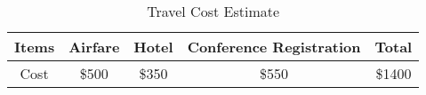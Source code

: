 \documentclass{res}
\begin{document}
\pagestyle{empty}


\begin{resume}

\begin{table}[!h]
\centering
\begin{tabular}{c||c|c|c||c}
\hline
Items & Airfare & Hotel & Conference Registration & Total \\
\hline
Cost & \$500 & \$350 & \$550 & \$1400\\
\hline
\end{tabular}
\caption{Travel Cost Estimate}
\label{tab:cost}
\end{table}

\end{resume}
\end{document}
